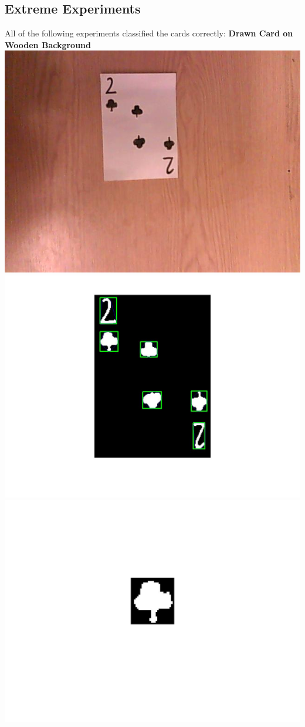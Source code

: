 \documentclass[11pt]{article}
\theoremstyle{plain}
\theoremstyle{definition}
\begin{document}
 \subsection{Extreme Experiments}
 All of the following experiments classified the cards correctly:
 \newline
 {\bf Drawn Card on Wooden Background}
 \newline
 \includegraphics[scale=0.1]{test0.jpg}
  \includegraphics[scale=0.07]{paperfull.jpg}
  \includegraphics[scale=0.07]{paperfeat.jpg}
\end{document}
